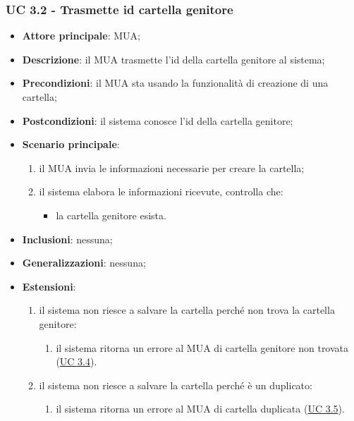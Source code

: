     \subsubsection{UC 3.2 - Trasmette id cartella genitore} \label{sec:UC3.2}
    \begin{itemize}
        \item \textbf{Attore principale}: MUA;
        \item \textbf{Descrizione}: il MUA trasmette l'id della cartella genitore al sistema;
        \item \textbf{Precondizioni}: il MUA sta usando la funzionalità di creazione di una cartella;
        \item \textbf{Postcondizioni}: il sistema conosce l'id della cartella genitore;
        \item \textbf{Scenario principale}:
            \begin{enumerate}
                \item il MUA invia le informazioni necessarie per creare la cartella;
                \item il sistema elabora le informazioni ricevute, controlla che:
                \begin{itemize}
                    \item la cartella genitore esista.
                \end{itemize}
            \end{enumerate}
        \item \textbf{Inclusioni}: nessuna;
        \item \textbf{Generalizzazioni}: nessuna;
        \item \textbf{Estensioni}:
            \begin{enumerate}[label=\alph*.]
                \item il sistema non riesce a salvare la cartella perché non trova la cartella genitore:
                \begin{enumerate}[label=\arabic*.]
                    \item il sistema ritorna un errore al MUA di cartella genitore non trovata (\hyperref[sec:UC3.4]{UC 3.4}).
                    \end{enumerate}
                \item il sistema non riesce a salvare la cartella perché è un duplicato:
                \begin{enumerate}[label=\arabic*.]
                    \item il sistema ritorna un errore al MUA di cartella duplicata (\hyperref[sec:UC3.5]{UC 3.5}).
                \end{enumerate}
                
            \end{enumerate}
    \end{itemize}



